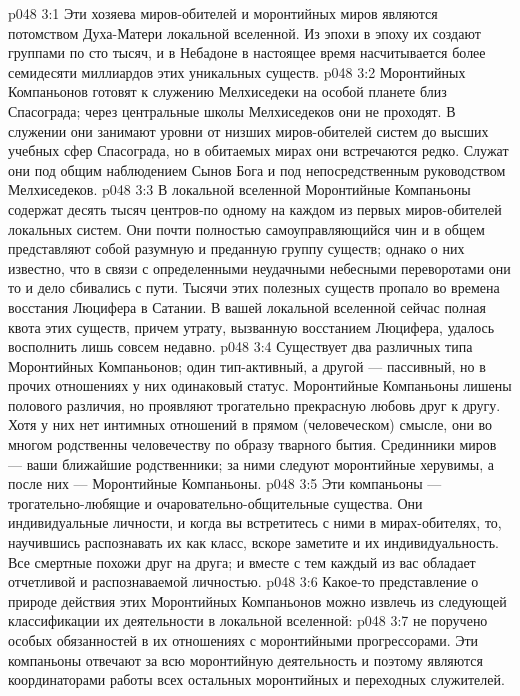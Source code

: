 \vs p048 3:1 Эти хозяева миров\hyp{}обителей и моронтийных миров являются потомством Духа\hyp{}Матери локальной вселенной. Из эпохи в эпоху их создают группами по сто тысяч, и в Небадоне в настоящее время насчитывается более семидесяти миллиардов этих уникальных существ.
\vs p048 3:2 Моронтийных Компаньонов готовят к служению Мелхиседеки на особой планете близ Спасограда; через центральные школы Мелхиседеков они не проходят. В служении они занимают уровни от низших миров\hyp{}обителей систем до высших учебных сфер Спасограда, но в обитаемых мирах они встречаются редко. Служат они под общим наблюдением Сынов Бога и под непосредственным руководством Мелхиседеков.
\vs p048 3:3 В локальной вселенной Моронтийные Компаньоны содержат десять тысяч центров\hyp{}по одному на каждом из первых миров\hyp{}обителей локальных систем. Они почти полностью самоуправляющийся чин и в общем представляют собой разумную и преданную группу существ; однако о них известно, что в связи с определенными неудачными небесными переворотами они то и дело сбивались с пути. Тысячи этих полезных существ пропало во времена восстания Люцифера в Сатании. В вашей локальной вселенной сейчас полная квота этих существ, причем утрату, вызванную восстанием Люцифера, удалось восполнить лишь совсем недавно.
\vs p048 3:4 \pc Существует два различных типа Моронтийных Компаньонов; один тип\hyp{}активный, а другой --- пассивный, но в прочих отношениях у них одинаковый статус. Моронтийные Компаньоны лишены полового различия, но проявляют трогательно прекрасную любовь друг к другу. Хотя у них нет интимных отношений в прямом (человеческом) смысле, они во многом родственны человечеству по образу тварного бытия. Срединники миров --- ваши ближайшие родственники; за ними следуют моронтийные херувимы, а после них --- Моронтийные Компаньоны.
\vs p048 3:5 Эти компаньоны --- трогательно\hyp{}любящие и очаровательно\hyp{}общительные существа. Они индивидуальные личности, и когда вы встретитесь с ними в мирах\hyp{}обителях, то, научившись распознавать их как класс, вскоре заметите и их индивидуальность. Все смертные похожи друг на друга; и вместе с тем каждый из вас обладает отчетливой и распознаваемой личностью.
\vs p048 3:6 \pc Какое\hyp{}то представление о природе действия этих Моронтийных Компаньонов можно извлечь из следующей классификации их деятельности в локальной вселенной:
\vs p048 3:7 \bibnobreakspace {} не поручено особых обязанностей в их отношениях с моронтийными прогрессорами. Эти компаньоны отвечают за всю моронтийную деятельность и поэтому являются координаторами работы всех остальных моронтийных и переходных служителей.

